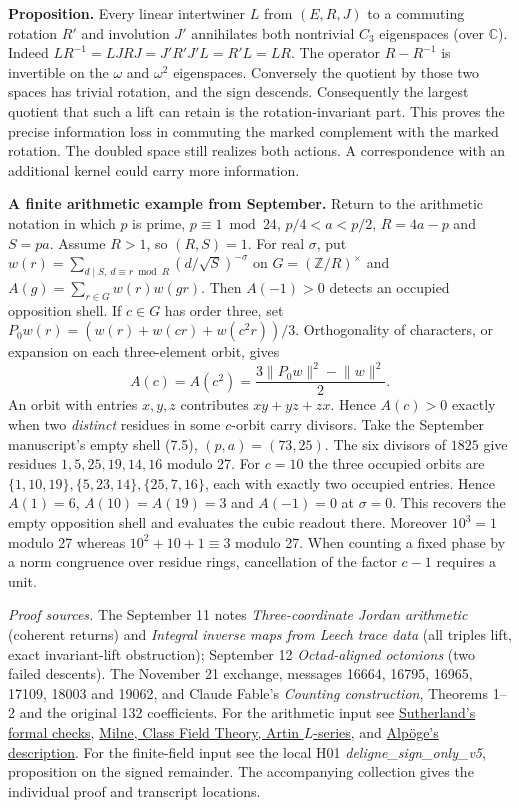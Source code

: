 \documentclass[11pt,a4paper]{article}
\newcommand{\Z}{\mathbb Z}
\newcommand{\C}{\mathbb C}
\begin{document}
\textbf{Proposition.} Every linear intertwiner $L$ from $(E,R,J)$ to a commuting rotation $R'$ and
involution $J'$ annihilates both nontrivial $C_3$ eigenspaces (over $\C$). Indeed
$LR^{-1}=LJRJ=J'R'J'L=R'L=LR$. The operator $R-R^{-1}$ is invertible on the $\omega$ and $\omega^2$
eigenspaces. Conversely the quotient by those two spaces has trivial rotation, and the sign descends.
Consequently the largest quotient that such a lift can retain is the rotation-invariant part. This proves
the precise information loss in commuting the marked complement with the marked rotation. The doubled
space still realizes both actions. A correspondence with an additional kernel could carry more information.

\textbf{A finite arithmetic example from September.} Return to the arithmetic notation in which $p$ is prime,
$p\equiv1\bmod24$, $p/4<a<p/2$, $R=4a-p$ and $S=pa$. Assume $R>1$, so $(R,S)=1$. For real $\sigma$, put
$w(r)=\sum_{d\mid S,\ d\equiv r\bmod R}(d/\sqrt S)^{-\sigma}$ on $G=(\Z/R)^\times$ and
$A(g)=\sum_{r\in G}w(r)w(gr)$. Then $A(-1)>0$ detects an occupied opposition shell.
If $c\in G$ has order three, set $P_0w(r)=(w(r)+w(cr)+w(c^2r))/3$. Orthogonality of characters, or
expansion on each three-element orbit, gives
\[
 A(c)=A(c^2)=\frac{3\lVert P_0w\rVert^2-\lVert w\rVert^2}{2}.
\]
An orbit with entries $x,y,z$ contributes $xy+yz+zx$. Hence $A(c)>0$ exactly when two \emph{distinct}
residues in some $c$-orbit carry divisors. Take the September manuscript's empty shell (7.5),
$(p,a)=(73,25)$. The six divisors of $1825$ give residues $1,5,25,19,14,16$ modulo 27.
For $c=10$ the three occupied orbits are $\{1,10,19\},\{5,23,14\},\{25,7,16\}$, each with exactly two
occupied entries. Hence $A(1)=6$, $A(10)=A(19)=3$ and $A(-1)=0$ at $\sigma=0$. This recovers the empty
opposition shell and evaluates the cubic readout there. Moreover $10^3=1$ modulo 27 whereas
$10^2+10+1\equiv3$ modulo 27. When counting a fixed phase by a norm congruence over residue rings, cancellation
of the factor $c-1$ requires a unit.

{\footnotesize
\textit{Proof sources.} The September 11 notes \emph{Three-coordinate Jordan arithmetic} (coherent returns)
and \emph{Integral inverse maps from Leech trace data} (all triples lift, exact invariant-lift obstruction);
September 12 \emph{Octad-aligned octonions} (two failed descents).
The November 21 exchange, messages 16664, 16795, 16965, 17109, 18003 and 19062, and Claude Fable's
\emph{Counting construction}, Theorems 1--2 and the original 132 coefficients.
For the arithmetic input see \href{https://math.mit.edu/~drew/grh/}{Sutherland's formal checks},
\href{https://www.jmilne.org/math/CourseNotes/CFT.pdf}{Milne, Class Field Theory, Artin $L$-series},
and \href{https://alpo.ge/remark.pdf}{Alpöge's description}. For the finite-field input see the local H01
\emph{deligne\_sign\_only\_v5}, proposition on the signed remainder. The accompanying collection gives the
individual proof and transcript locations.}
\end{document}
